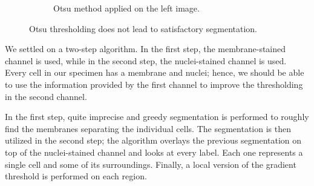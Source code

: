 \documentclass[
  digital,     %
  oneside,     %
  nosansbold,  %
  nocolorbold, %
  lof,         %
  lot,         %
]{fithesis4}
\begin{document}
\begin{figure}
\begin{subfigure}[t]{0.45\textwidth}
        \caption{Otsu method applied on the left image.}
        \label{fig:otsu-naive}
    \end{subfigure}
    \caption{Otsu thresholding does not lead to satisfactory segmentation.}
    \label{fig:otsu-nuclei-demo}
\end{figure}
We settled on a two-step algorithm. In the first step, the membrane-stained
channel is used, while in the second step, the nuclei-stained channel is used.
Every cell in our specimen has a membrane and nuclei; hence, we should be able
to use the information provided by the first channel to improve the thresholding
in the second channel.

In the first step, quite imprecise and greedy segmentation is performed to
roughly find the membranes separating the individual cells. The segmentation is
then utilized in the second step; the algorithm overlays the previous
segmentation on top of the nuclei-stained channel and looks at every label.
Each one represents a single cell and some of its surroundings. Finally, a
local version of the gradient threshold is performed on each region.
\end{document}
